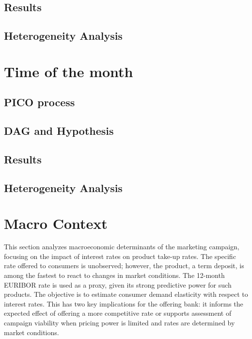 \documentclass[
  12pt,
]{article}
\begin{document}
\subsection{Results}\label{results}

\subsection{Heterogeneity Analysis}\label{heterogeneity-analysis}

\newpage

\section{Time of the month}\label{time-of-the-month}

\subsection{PICO process}\label{pico-process-1}

\subsection{DAG and Hypothesis}\label{dag-and-hypothesis-1}

\subsection{Results}\label{results-1}

\subsection{Heterogeneity Analysis}\label{heterogeneity-analysis-1}

\newpage

\section{Macro Context}\label{macro-context}

This section analyzes macroeconomic determinants of the marketing
campaign, focusing on the impact of interest rates on product take-up
rates. The specific rate offered to consumers is unobserved; however,
the product, a term deposit, is among the fastest to react to changes in
market conditions. The 12-month EURIBOR rate is used as a proxy, given
its strong predictive power for such products. The objective is to
estimate consumer demand elasticity with respect to interest rates. This
has two key implications for the offering bank: it informs the expected
effect of offering a more competitive rate or supports assessment of
campaign viability when pricing power is limited and rates are
determined by market conditions.
\end{document}
